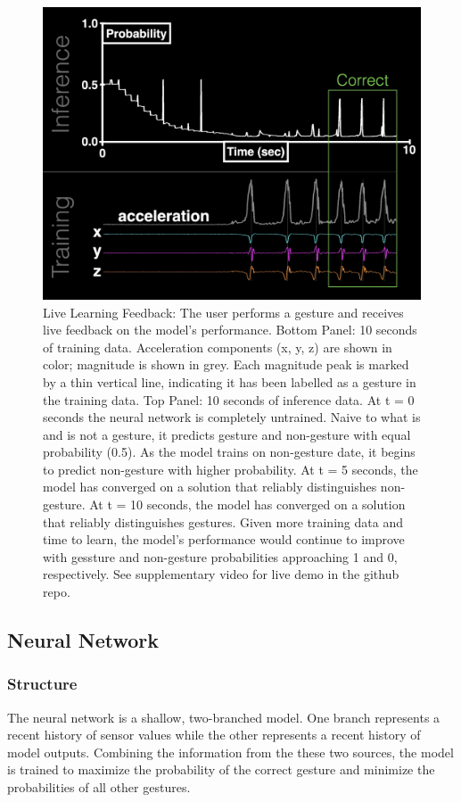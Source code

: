 \documentclass{nime-alternate} %
\begin{document}
\begin{figure}[h]
    \centering
    \includegraphics[width=1.0\textwidth]{../figures/realtime_training.jpg}
    \caption{Live Learning Feedback: The user performs a gesture and receives live feedback on the model's performance. Bottom Panel: 10 seconds of training data. Acceleration components (x, y, z) are shown in color; magnitude is shown in grey. Each magnitude peak is marked by a thin vertical line, indicating it has been labelled as a gesture in the training data. Top Panel: 10 seconds of inference data. At t = 0 seconds the neural network is completely untrained. Naive to what is and is not a gesture, it predicts gesture and non-gesture with equal probability (0.5). As the model trains on non-gesture date, it begins to predict non-gesture with higher probability. At t = 5 seconds, the model has converged on a solution that reliably distinguishes non-gesture. At t = 10 seconds, the model has converged on a solution that reliably distinguishes gestures. Given more training data and time to learn, the model's performance would continue to improve with gessture and non-gesture probabilities approaching 1 and 0, respectively. See supplementary video for live demo in the github repo.}
    \label{fig:realtime_training}
\end{figure}

\subsection{Neural Network}
\subsubsection{Structure}
The neural network is a shallow, two-branched model. One branch represents a recent history of sensor values while the other represents a recent history of model outputs. Combining the information from the these two sources, the model is trained to maximize the probability of the correct gesture and minimize the probabilities of all other gestures.
\end{document}
